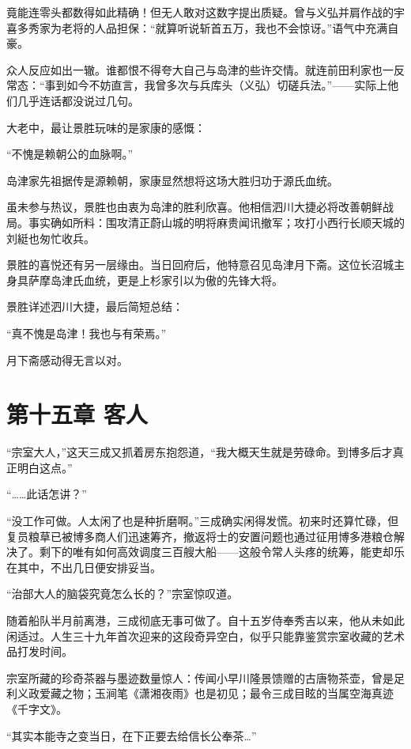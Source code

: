 \documentclass[
]{article}
\begin{document}
竟能连零头都数得如此精确！但无人敢对这数字提出质疑。曾与义弘并肩作战的宇喜多秀家为老将的人品担保：``就算听说斩首五万，我也不会惊讶。''语气中充满自豪。

众人反应如出一辙。谁都恨不得夸大自己与岛津的些许交情。就连前田利家也一反常态：``事到如今不妨直言，我曾多次与兵库头（义弘）切磋兵法。''------实际上他们几乎连话都没说过几句。

大老中，最让景胜玩味的是家康的感慨：

``不愧是赖朝公的血脉啊。''

岛津家先祖据传是源赖朝，家康显然想将这场大胜归功于源氏血统。

虽未参与热议，景胜也由衷为岛津的胜利欣喜。他相信泗川大捷必将改善朝鲜战局。事实确如所料：围攻清正蔚山城的明将麻贵闻讯撤军；攻打小西行长顺天城的刘綎也匆忙收兵。

景胜的喜悦还有另一层缘由。当日回府后，他特意召见岛津月下斋。这位长沼城主身具萨摩岛津氏血统，更是上杉家引以为傲的先锋大将。

景胜详述泗川大捷，最后简短总结：

``真不愧是岛津！我也与有荣焉。''

月下斋感动得无言以对。

\section*{第十五章 客人}\label{ux7b2cux5341ux4e94ux7ae0-ux5ba2ux4eba}

``宗室大人，''这天三成又抓着房东抱怨道，``我大概天生就是劳碌命。到博多后才真正明白这点。''

``\ldots\ldots 此话怎讲？''

``没工作可做。人太闲了也是种折磨啊。''三成确实闲得发慌。初来时还算忙碌，但复员粮草已被博多商人们迅速筹齐，撤返将士的安置问题也通过征用博多港粮仓解决了。剩下的唯有如何高效调度三百艘大船------这般令常人头疼的统筹，能吏却乐在其中，不出几日便安排妥当。

``治部大人的脑袋究竟怎么长的？''宗室惊叹道。

随着船队半月前离港，三成彻底无事可做了。自十五岁侍奉秀吉以来，他从未如此闲适过。人生三十九年首次迎来的这段奇异空白，似乎只能靠鉴赏宗室收藏的艺术品打发时间。

宗室所藏的珍奇茶器与墨迹数量惊人：传闻小早川隆景馈赠的古唐物茶壶，曾是足利义政爱藏之物；玉涧笔《潇湘夜雨》也是初见；最令三成目眩的当属空海真迹《千字文》。

``其实本能寺之变当日，在下正要去给信长公奉茶\ldots{}''
\end{document}
